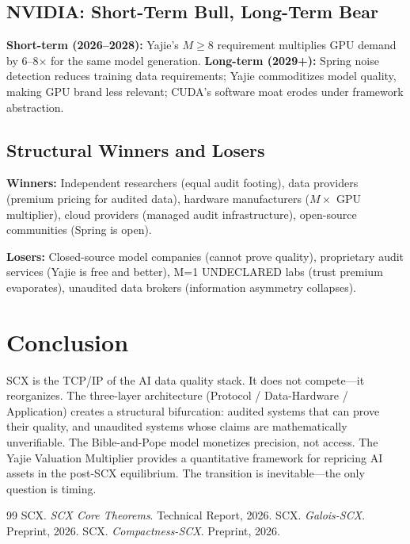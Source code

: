 \documentclass[12pt,a4paper]{article}
\theoremstyle{remark}
\begin{document}
\subsection{NVIDIA: Short-Term Bull, Long-Term Bear}
\textbf{Short-term (2026--2028):} Yajie's \(M \geq 8\) requirement multiplies GPU demand by 6--8\(\times\) for the same model generation. \textbf{Long-term (2029+):} Spring noise detection reduces training data requirements; Yajie commoditizes model quality, making GPU brand less relevant; CUDA's software moat erodes under framework abstraction.

\subsection{Structural Winners and Losers}
\textbf{Winners:} Independent researchers (equal audit footing), data providers (premium pricing for audited data), hardware manufacturers (\(M\times\) GPU multiplier), cloud providers (managed audit infrastructure), open-source communities (Spring is open).

\textbf{Losers:} Closed-source model companies (cannot prove quality), proprietary audit services (Yajie is free and better), M=1 UNDECLARED labs (trust premium evaporates), unaudited data brokers (information asymmetry collapses).
\section{Conclusion}
SCX is the TCP/IP of the AI data quality stack. It does not compete---it reorganizes. The three-layer architecture (Protocol / Data-Hardware / Application) creates a structural bifurcation: audited systems that can prove their quality, and unaudited systems whose claims are mathematically unverifiable. The Bible-and-Pope model monetizes precision, not access. The Yajie Valuation Multiplier provides a quantitative framework for repricing AI assets in the post-SCX equilibrium. The transition is inevitable---the only question is timing.
\begin{thebibliography}{99}
 SCX. \emph{SCX Core Theorems}. Technical Report, 2026.
 SCX. \emph{Galois-SCX}. Preprint, 2026.
 SCX. \emph{Compactness-SCX}. Preprint, 2026.
\end{thebibliography}
\end{document}
